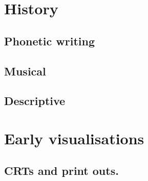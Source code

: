\documentclass[
]{book}
\begin{document}
\hypertarget{history}{%
\chapter{History}\label{history}}

\hypertarget{phonetic-writing}{%
\section{Phonetic writing}\label{phonetic-writing}}

\hypertarget{musical}{%
\section{Musical}\label{musical}}

\hypertarget{descriptive}{%
\section{Descriptive}\label{descriptive}}

\hypertarget{early-viz}{%
\chapter{Early visualisations}\label{early-viz}}

\hypertarget{crts-and-print-outs.}{%
\section{CRTs and print outs.}\label{crts-and-print-outs.}}

  
\end{document}
